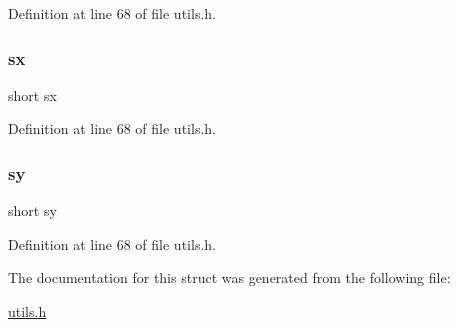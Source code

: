 Definition at line 68 of file utils.\+h.

\mbox{\label{structrect_ad412d3c503fde76edb4b79e9bb5bdee4}} 
\subsubsection{\texorpdfstring{sx}{sx}}
{\footnotesize\ttfamily short sx}



Definition at line 68 of file utils.\+h.

\mbox{\label{structrect_a0153fced86e1addd87ec429590e82741}} 
\subsubsection{\texorpdfstring{sy}{sy}}
{\footnotesize\ttfamily short sy}



Definition at line 68 of file utils.\+h.



The documentation for this struct was generated from the following file\+:\begin{DoxyCompactItemize}
\item 
\mbox{\hyperlink{utils_8h}{utils.\+h}}\end{DoxyCompactItemize}
